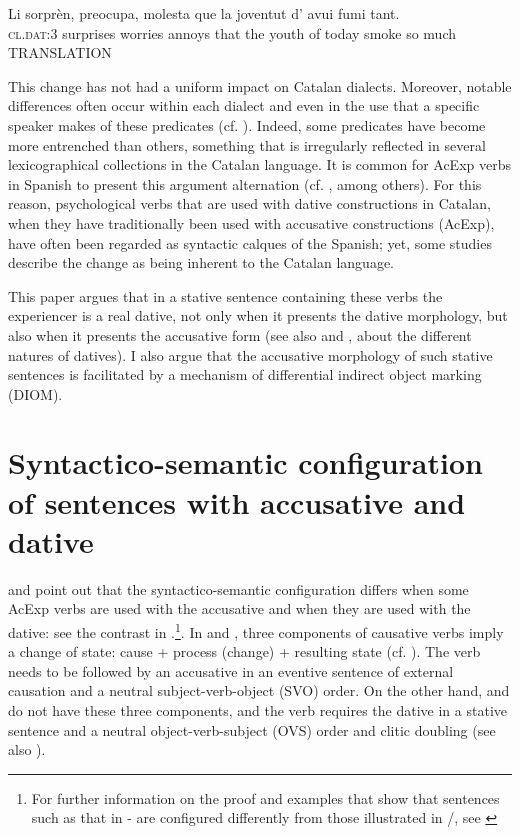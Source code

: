 \documentclass[output=paper,modfonts,nonflat,newtxmath]{langsci/langscibook}
\begin{document}
 \ex \label{ex:royo:2b}
 \gll Li {sorprèn}, {preocupa}, {molesta} que la joventut d’ avui fumi tant.\\
 \textsc{cl.dat:3} surprises worries annoys that the youth of today smoke so much\\
 \glt TRANSLATION
 
 \z
 \z
 

This change has not had a uniform impact on Catalan dialects. Moreover, notable differences often occur within each dialect and even in the use that a specific speaker makes of these predicates (cf. \citealt[70]{CabreMateu1998}). Indeed, some predicates have become more entrenched than others, something that is irregularly reflected in several lexicographical collections in the Catalan language. It is common for AcExp verbs in Spanish to present this argument alternation (cf. \citealt{MendivilGiro2005, MarinMcNally2011}, among others). For this reason, psychological verbs that are used with dative constructions in Catalan, when they have traditionally been used with accusative constructions (AcExp), have often been regarded as syntactic calques of the Spanish; yet, some studies describe the change as being inherent to the Catalan language.

This paper argues that in a stative sentence containing these verbs the experiencer is a real dative, not only when it presents the dative morphology, but also when it presents the accusative form (see also  and , about the different natures of datives). I also argue that the accusative morphology of such stative sentences is facilitated by a mechanism of differential indirect object marking (DIOM).

\section{Syntactico-semantic configuration of sentences with accusative and dative} %

\citet{Ynglès1991} and \citet{CabreMateu1998} point out that the syntactico-semantic configuration differs when some AcExp verbs are used with the accusative and when they are used with the dative: see the contrast in .\footnote{For further information on the proof and examples that show that sentences such as that in  - are configured differently from those illustrated in /, see \citet[Section 4.1]{Royo2017}}. In  and , three components of causative verbs imply a change of state: cause + process (change) + resulting state (cf. \citealt{LevinRappaportHovav1995, CabreMateu1998, Rossello2008}). The verb needs to be followed by an accusative in an eventive sentence of external causation and a neutral subject-verb-object (SVO) order. On the other hand,  and  do not have these three components, and the verb requires the dative in a stative sentence and a neutral object-verb-subject (OVS) order and clitic doubling (see also ).
\end{document}
